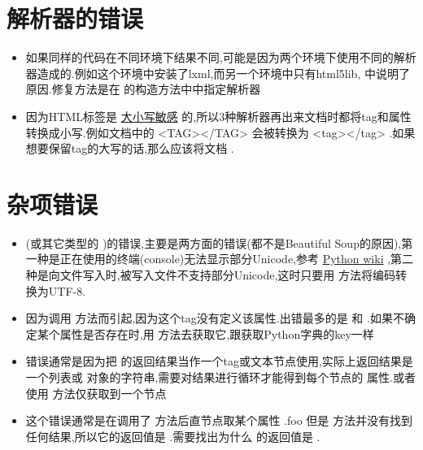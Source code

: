 \documentclass[letterpaper,12pt,english]{sphinxmanual}
\begin{document}
\section{解析器的错误}
\label{index:id69}\begin{itemize}
\item {} 
如果同样的代码在不同环境下结果不同,可能是因为两个环境下使用不同的解析器造成的.例如这个环境中安装了lxml,而另一个环境中只有html5lib, {\hyperref[index:id53]{}} 中说明了原因.修复方法是在  的构造方法中中指定解析器

\item {} 
因为HTML标签是 \href{http://www.w3.org/TR/html5/syntax.html\#syntax}{大小写敏感} 的,所以3种解析器再出来文档时都将tag和属性转换成小写.例如文档中的 \textless{}TAG\textgreater{}\textless{}/TAG\textgreater{} 会被转换为 \textless{}tag\textgreater{}\textless{}/tag\textgreater{} .如果想要保留tag的大写的话,那么应该将文档 {\hyperref[index:xml]{}} .

\end{itemize}


\section{杂项错误}
\label{index:id71}\begin{itemize}
\item {} 
 (或其它类型的  )的错误,主要是两方面的错误(都不是Beautiful Soup的原因),第一种是正在使用的终端(console)无法显示部分Unicode,参考 \href{http://wiki.Python.org/moin/PrintFails}{Python wiki} ,第二种是向文件写入时,被写入文件不支持部分Unicode,这时只要用  方法将编码转换为UTF-8.

\item {} 
 因为调用  方法而引起,因为这个tag没有定义该属性.出错最多的是  和  .如果不确定某个属性是否存在时,用  方法去获取它,跟获取Python字典的key一样

\item {} 
 错误通常是因为把  的返回结果当作一个tag或文本节点使用,实际上返回结果是一个列表或  对象的字符串,需要对结果进行循环才能得到每个节点的  属性.或者使用  方法仅获取到一个节点

\item {} 
 这个错误通常是在调用了  方法后直节点取某个属性 .foo 但是  方法并没有找到任何结果,所以它的返回值是  .需要找出为什么  的返回值是  .

\end{itemize}
\end{document}
